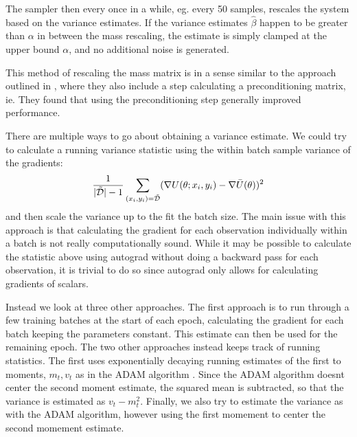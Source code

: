 The sampler then every once in a while, eg. every 50 samples, rescales the system based on the variance estimates.
If the variance estimates $\hat \beta$ happen to be greater than $\alpha$ in between the mass rescaling, the estimate is simply clamped at the upper bound $\alpha$, and no additional noise is generated.  

This method of rescaling the mass matrix is in a sense similar to the approach outlined in \cite{wenzel_how_2020}, where they also include a step calculating a preconditioning matrix, ie.
They found that using the preconditioning step generally improved performance.

There are multiple ways to go about obtaining a variance estimate.
We could try to calculate a running variance statistic using the within batch sample variance of the gradients:
\begin{equation}
    \frac{1}{|\tilde{\mathcal{D}}|-1}\sum_{(x_i,y_i)=\tilde{\mathcal{D}}} (\nabla U(\theta; x_i, y_i) - \nabla \bar{U}(\theta))^2
\end{equation}
and then scale the variance up to the fit the batch size. 
The main issue with this approach is that calculating the gradient for each observation individually within a batch is not really computationally sound.
While it may be possible to calculate the statistic above using autograd without doing a backward pass for each observation, it is trivial to do so since autograd only allows for calculating gradients of scalars. 

Instead we look at three other approaches. 
The first approach is to run through a few training batches at the start of each epoch, calculating the gradient for each batch keeping the parameters constant. 
This estimate can then be used for the remaining epoch. 
The two other approaches instead keeps track of running statistics. 
The first uses exponentially decaying running estimates of the first to moments, $m_t, v_t$ as in the ADAM algorithm \cite{kingma_adam_2017}.
Since the ADAM algorithm doesnt center the second moment estimate, the squared mean is subtracted, so that the variance is estimated as $v_t - m_t^2$.
Finally, we also try to estimate the variance as with the ADAM algorithm, however using the first momement to center the second momement estimate. 

